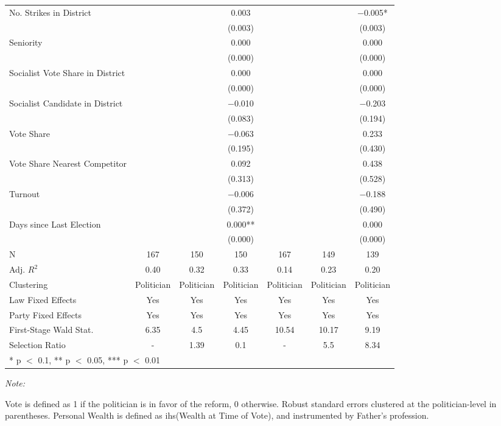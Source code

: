 \begin{table}[!h]
{\begin{threeparttable}
\begin{tabular}[t]{lcccccc}
No. Strikes in District &  &  & \num{0.003} &  &  & \num{-0.005}*\\
 &  &  & (\num{0.003}) &  &  & (\num{0.003})\\
Seniority &  &  & \num{0.000} &  &  & \num{0.000}\\
 &  &  & (\num{0.000}) &  &  & \vphantom{2} (\num{0.000})\\
Socialist Vote Share in District &  &  & \num{0.000} &  &  & \num{0.000}\\
 &  &  & (\num{0.000}) &  &  & \vphantom{1} (\num{0.000})\\
Socialist Candidate in District &  &  & \num{-0.010} &  &  & \num{-0.203}\\
 &  &  & (\num{0.083}) &  &  & (\num{0.194})\\
Vote Share &  &  & \num{-0.063} &  &  & \num{0.233}\\
 &  &  & (\num{0.195}) &  &  & (\num{0.430})\\
Vote Share Nearest Competitor &  &  & \num{0.092} &  &  & \num{0.438}\\
 &  &  & (\num{0.313}) &  &  & (\num{0.528})\\
Turnout &  &  & \num{-0.006} &  &  & \num{-0.188}\\
 &  &  & (\num{0.372}) &  &  & (\num{0.490})\\
Days since Last Election &  &  & \num{0.000}** &  &  & \num{0.000}\\
 &  &  & (\num{0.000}) &  &  & (\num{0.000})\\
\midrule
N & \num{167} & \num{150} & \num{150} & \num{167} & \num{149} & \num{139}\\
Adj. $R^2$ & \num{0.40} & \num{0.32} & \num{0.33} & \num{0.14} & \num{0.23} & \num{0.20}\\
Clustering & Politician & Politician & Politician & Politician & Politician & Politician\\
Law Fixed Effects & Yes & Yes & Yes & Yes & Yes & Yes\\
Party Fixed Effects & Yes & Yes & Yes & Yes & Yes & Yes\\
First-Stage Wald Stat. & 6.35 & 4.5 & 4.45 & 10.54 & 10.17 & 9.19\\
Selection Ratio & - & 1.39 & 0.1 & - & 5.5 & 8.34\\
\bottomrule
\multicolumn{7}{l}{\rule{0pt}{1em}* p $<$ 0.1, ** p $<$ 0.05, *** p $<$ 0.01}\\
\end{tabular}
\begin{tablenotes}[para]
\item \textit{Note: } 
\item Vote is defined as 1 if the politician is in favor of the reform, 0 otherwise. Robust standard errors clustered at the politician-level in parentheses. Personal Wealth is defined as ihs(Wealth at Time of Vote), and instrumented by Father's profession.
\end{tablenotes}
\end{threeparttable}}
\end{table}
